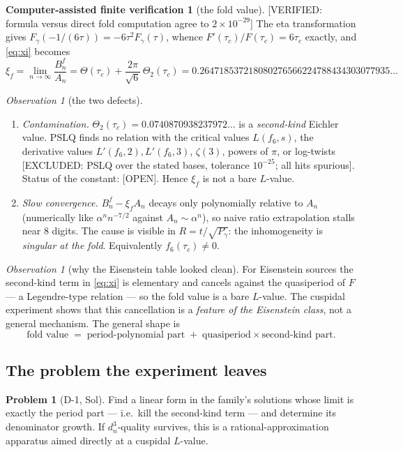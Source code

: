 \documentclass[11pt,reqno]{amsart}
\theoremstyle{plain}
\theoremstyle{definition}
\newtheorem{verification}[theorem]{Computer-assisted finite verification}
\newtheorem{problem}[theorem]{Problem}
\theoremstyle{remark}
\newtheorem{observation}[theorem]{Observation}
\newcommand{\VerifiedR}[1]{\textup{\textsf{[VERIFIED: #1]}}}
\newcommand{\ExcludedR}[1]{\textup{\textsf{[EXCLUDED: #1]}}}
\newcommand{\Open}{\textup{\textsf{[OPEN]}}}
\begin{document}
\begin{verification}[the fold value]\label{ver:xi6}
\VerifiedR{formula versus direct fold computation agree to $2\times10^{-29}$}
The eta transformation gives $F_\gamma(-1/(6\tau))=-6\tau^2F_\gamma(\tau)$,
whence $F'(\tau_c)/F(\tau_c)=6\tau_c$ exactly, and \eqref{eq:xi} becomes
\[
\xi_f=\lim_{n\to\infty}\frac{B^f_n}{A_n}
 =\Theta(\tau_c)+\frac{2\pi}{\sqrt6}\,\Theta_2(\tau_c)
 =0.264718537218080276566224788434303077935\ldots
\]
\end{verification}

\begin{observation}[the two defects]\label{obs:defects6}
\begin{enumerate}[leftmargin=2em]
\item \emph{Contamination.} $\Theta_2(\tau_c)=0.0740870938237972\ldots$ is a
\emph{second-kind} Eichler value. PSLQ finds no relation with the critical
values $L(f_6,s)$, the derivative values $L'(f_6,2),L'(f_6,3)$, $\zeta(3)$,
powers of $\pi$, or log-twists \ExcludedR{PSLQ over the stated bases,
tolerance $10^{-25}$; all hits spurious}. Status of the constant:
\Open. Hence $\xi_f$ is not a bare $L$-value.
\item \emph{Slow convergence.} $B^f_n-\xi_fA_n$ decays only polynomially
relative to $A_n$ (numerically like $\alpha^{n}n^{-7/2}$ against
$A_n\sim\alpha^n$), so naive ratio extrapolation stalls near $8$ digits.
The cause is visible in $R=t/\sqrt{P_\gamma}$: the inhomogeneity is
\emph{singular at the fold}. Equivalently $f_6(\tau_c)\ne0$.
\end{enumerate}
\end{observation}

\begin{observation}[why the Eisenstein table looked clean]
For Eisenstein sources the second-kind term in \eqref{eq:xi} is elementary
and cancels against the quasiperiod of $F$ --- a Legendre-type relation ---
so the fold value is a bare $L$-value. The cuspidal experiment shows that
this cancellation is a \emph{feature of the Eisenstein class}, not a general
mechanism. The general shape is
\[
\text{fold value}\;=\;\text{period-polynomial part}
\;+\;\text{quasiperiod}\times\text{second-kind part}.
\]
\end{observation}

\subsection{The problem the experiment leaves}
\begin{problem}[D-1, Sol]\label{prob:d1}
Find a linear form in the family's solutions whose limit is exactly the
period part --- i.e.\ kill the second-kind term --- and determine its
denominator growth. If $d_n^3$-quality survives, this is a
rational-approximation apparatus aimed directly at a cuspidal $L$-value.
\end{problem}
\end{document}
